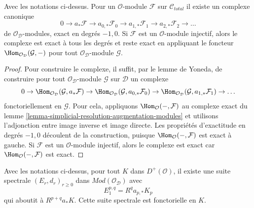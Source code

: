 \begin{lemma}
\label{lemma-augmentation-cech-complex-modules}
Avec les notations ci-dessus.
Pour un $\mathcal{O}$-module $\mathcal{F}$ sur $\mathcal{C}_{total}$
il existe un complexe canonique
$$
0 \to a_*\mathcal{F} \to a_{0, *}\mathcal{F}_0 \to a_{1, *}\mathcal{F}_1 \to
a_{2, *}\mathcal{F}_2 \to \ldots
$$
de $\mathcal{O}_\mathcal{D}$-modules, exact en degrés $-1, 0$.
Si $\mathcal{F}$ est un $\mathcal{O}$-module injectif, alors le complexe
est exact à tous les degrés et reste exact en appliquant le foncteur
$\Hom_{\mathcal{O}_\mathcal{D}}(\mathcal{G}, -)$ pour tout
$\mathcal{O}_\mathcal{D}$-module $\mathcal{G}$.
\end{lemma}

\begin{proof}
Pour construire le complexe, il suffit, par le lemme de Yoneda, de construire pour tout
$\mathcal{O}_\mathcal{D}$-module $\mathcal{G}$ sur $\mathcal{D}$
un complexe
$$
0 \to \Hom_{\mathcal{O}_\mathcal{D}}(\mathcal{G}, a_*\mathcal{F}) \to
\Hom_{\mathcal{O}_\mathcal{D}}(\mathcal{G}, a_{0, *}\mathcal{F}_0) \to
\Hom_{\mathcal{O}_\mathcal{D}}(\mathcal{G}, a_{1, *}\mathcal{F}_1) \to \ldots
$$
fonctoriellement en $\mathcal{G}$. Pour cela, appliquons
$\Hom_\mathcal{O}(-, \mathcal{F})$
au complexe exact du
lemme \ref{lemma-simplicial-resolution-augmentation-modules}
et utilisons l'adjonction entre image inverse et image directe.
Les propriétés d'exactitude en degrés $-1, 0$ découlent de
la construction, puisque $\Hom_\mathcal{O}(-, \mathcal{F})$ est exact à gauche.
Si $\mathcal{F}$ est un $\mathcal{O}$-module injectif, alors le complexe
est exact car $\Hom_\mathcal{O}(-, \mathcal{F})$ est exact.
\end{proof}

\begin{lemma}
\label{lemma-augmentation-spectral-sequence-modules}
Avec les notations ci-dessus, pour tout $K$ dans $D^+(\mathcal{O})$, il existe une suite
spectrale $(E_r, d_r)_{r \geq 0}$ dans $\textit{Mod}(\mathcal{O}_\mathcal{D})$
avec
$$
E_1^{p, q} = R^qa_{p, *} K_p
$$
qui aboutit à $R^{p + q}a_*K$. Cette suite spectrale est fonctorielle en $K$.
\end{lemma}

